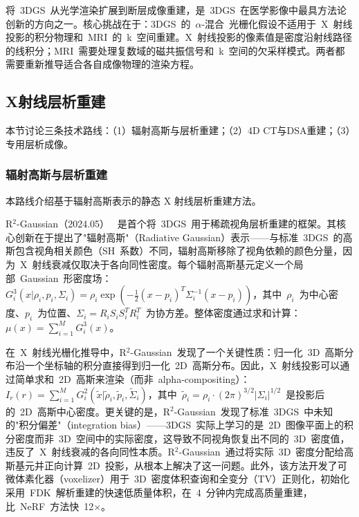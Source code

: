将~3DGS~从光学渲染扩展到断层成像重建，是~3DGS~在医学影像中最具方法论创新的方向之一。核心挑战在于：3DGS~的~$\alpha$-混合~光栅化假设不适用于~X~射线投影的积分物理和~MRI~的~k~空间重建。X~射线投影的像素值是密度沿射线路径的线积分；MRI~需要处理复数域的磁共振信号和~k~空间的欠采样模式。两者都需要重新推导适合各自成像物理的渲染方程。

\subsection{X射线层析重建}
\label{ss:19_4}

本节讨论三条技术路线：（1）辐射高斯与层析重建；（2）4D CT与DSA重建；（3）专用层析成像。

\subsubsection{辐射高斯与层析重建}

本路线介绍基于辐射高斯表示的静态 X 射线层析重建方法。

R$^2$-Gaussian（2024.05）~\cite{2405_20693} 是首个将~3DGS~用于稀疏视角层析重建的框架。其核心创新在于提出了"辐射高斯"（Radiative Gaussian）表示——与标准~3DGS~的高斯包含视角相关颜色（SH~系数）不同，辐射高斯移除了视角依赖的颜色分量，因为~X~射线衰减仅取决于各向同性密度。每个辐射高斯基元定义一个局部~Gaussian~形密度场：$G_i^3(x | \rho_i, p_i, \Sigma_i) = \rho_i \exp(-\frac{1}{2}(x - p_i)^T \Sigma_i^{-1}(x - p_i))$，其中~$\rho_i$~为中心密度、$p_i$~为位置、$\Sigma_i = R_i S_i S_i^T R_i^T$~为协方差。整体密度通过求和计算：$\mu(x) = \sum_{i=1}^{M} G_i^3(x)$。

在~X~射线光栅化推导中，R$^2$-Gaussian~发现了一个关键性质：归一化~3D~高斯分布沿一个坐标轴的积分直接得到归一化~2D~高斯分布。因此，X~射线投影可以通过简单求和~2D~高斯来渲染（而非~alpha-compositing）：$I_r(r) = \sum_{i=1}^{M} G_i^2(\tilde{x} | \tilde{\rho}_i, \tilde{p}_i, \tilde{\Sigma}_i)$，其中~$\tilde{\rho}_i = \rho_i \cdot (2\pi)^{3/2}|\Sigma_i|^{1/2}$~是投影后的~2D~高斯中心密度。更关键的是，R$^2$-Gaussian~发现了标准~3DGS~中未知的"积分偏差"（integration bias）——3DGS~实际上学习的是~2D~图像平面上的积分密度而非~3D~空间中的实际密度，这导致不同视角恢复出不同的~3D~密度值，违反了~X~射线衰减的各向同性本质。R$^2$-Gaussian~通过将实际~3D~密度分配给高斯基元并正向计算~2D~投影，从根本上解决了这一问题。此外，该方法开发了可微体素化器（voxelizer）用于~3D~密度体积查询和全变分（TV）正则化，初始化采用~FDK~解析重建的快速低质量体积，在~4~分钟内完成高质量重建，比~NeRF~方法快~12$\times$。

